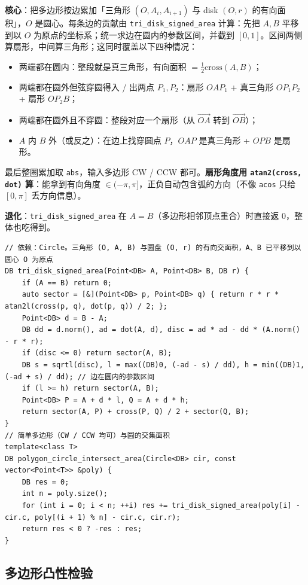 		\textbf{核心}：把多边形按边累加「三角形 $(O, A_i, A_{i+1})$ 与 disk $(O, r)$ 的有向面积」，$O$ 是圆心。每条边的贡献由 \texttt{tri\_disk\_signed\_area} 计算：先把 $A, B$ 平移到以 $O$ 为原点的坐标系；统一求边在圆内的参数区间，并截到 $[0,1]$。区间两侧算扇形，中间算三角形；这同时覆盖以下四种情况：
		\begin{itemize}
			\setlength\itemsep{0pt}
			\item 两端都在圆内：整段就是真三角形，有向面积 $= \tfrac{1}{2} \mathrm{cross}(A, B)$；
			\item 两端都在圆外但弦穿圆得入 / 出两点 $P_1, P_2$：扇形 $OAP_1$ + 真三角形 $OP_1 P_2$ + 扇形 $OP_2 B$；
			\item 两端都在圆外且不穿圆：整段对应一个扇形（从 $\vec{OA}$ 转到 $\vec{OB}$）；
			\item $A$ 内 $B$ 外（或反之）：在边上找穿圆点 $P$，$OAP$ 是真三角形 + $OPB$ 是扇形。
		\end{itemize}
		最后整圈累加取 \texttt{abs}，输入多边形 CW / CCW 都可。\textbf{扇形角度用 \texttt{atan2(cross, dot)} 算}：能拿到有向角度 $\in (-\pi, \pi]$，正负自动包含弧的方向（不像 \texttt{acos} 只给 $[0, \pi]$ 丢方向信息）。

		\textbf{退化}：\texttt{tri\_disk\_signed\_area} 在 $A = B$（多边形相邻顶点重合）时直接返 0，整体也吃得到。

\begin{verbatim}
// 依赖：Circle。三角形 (O, A, B) 与圆盘 (O, r) 的有向交面积，A、B 已平移到以圆心 O 为原点
DB tri_disk_signed_area(Point<DB> A, Point<DB> B, DB r) {
	if (A == B) return 0;
	auto sector = [&](Point<DB> p, Point<DB> q) { return r * r * atan2l(cross(p, q), dot(p, q)) / 2; };
	Point<DB> d = B - A;
	DB dd = d.norm(), ad = dot(A, d), disc = ad * ad - dd * (A.norm() - r * r);
	if (disc <= 0) return sector(A, B);
	DB s = sqrtl(disc), l = max((DB)0, (-ad - s) / dd), h = min((DB)1, (-ad + s) / dd); // 边在圆内的参数区间
	if (l >= h) return sector(A, B);
	Point<DB> P = A + d * l, Q = A + d * h;
	return sector(A, P) + cross(P, Q) / 2 + sector(Q, B);
}
// 简单多边形（CW / CCW 均可）与圆的交集面积
template<class T>
DB polygon_circle_intersect_area(Circle<DB> cir, const vector<Point<T>> &poly) {
	DB res = 0;
	int n = poly.size();
	for (int i = 0; i < n; ++i) res += tri_disk_signed_area(poly[i] - cir.c, poly[(i + 1) % n] - cir.c, cir.r);
	return res < 0 ? -res : res;
}
\end{verbatim}

		\subsection{多边形凸性检验}

